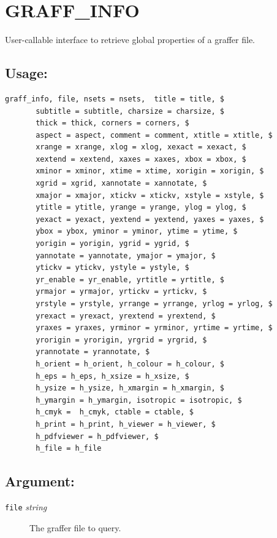 \documentclass[11pt,twoside,english]{article}
\begin{document}
\section{GRAFF\_INFO}
\label{sec:graff_info}

 
	User-callable interface to retrieve global properties of a graffer
	file.

 \subsection{Usage:}
 \label{sec:gi-usage}

 
\begin{verbatim}
graff_info, file, nsets = nsets,  title = title, $
       subtitle = subtitle, charsize = charsize, $
       thick = thick, corners = corners, $
       aspect = aspect, comment = comment, xtitle = xtitle, $
       xrange = xrange, xlog = xlog, xexact = xexact, $
       xextend = xextend, xaxes = xaxes, xbox = xbox, $
       xminor = xminor, xtime = xtime, xorigin = xorigin, $
       xgrid = xgrid, xannotate = xannotate, $
       xmajor = xmajor, xtickv = xtickv, xstyle = xstyle, $
       ytitle = ytitle, yrange = yrange, ylog = ylog, $
       yexact = yexact, yextend = yextend, yaxes = yaxes, $
       ybox = ybox, yminor = yminor, ytime = ytime, $
       yorigin = yorigin, ygrid = ygrid, $
       yannotate = yannotate, ymajor = ymajor, $
       ytickv = ytickv, ystyle = ystyle, $
       yr_enable = yr_enable, yrtitle = yrtitle, $
       yrmajor = yrmajor, yrtickv = yrtickv, $
       yrstyle = yrstyle, yrrange = yrrange, yrlog = yrlog, $
       yrexact = yrexact, yrextend = yrextend, $
       yraxes = yraxes, yrminor = yrminor, yrtime = yrtime, $
       yrorigin = yrorigin, yrgrid = yrgrid, $
       yrannotate = yrannotate, $
       h_orient = h_orient, h_colour = h_colour, $
       h_eps = h_eps, h_xsize = h_xsize, $
       h_ysize = h_ysize, h_xmargin = h_xmargin, $
       h_ymargin = h_ymargin, isotropic = isotropic, $
       h_cmyk =  h_cmyk, ctable = ctable, $
       h_print = h_print, h_viewer = h_viewer, $
       h_pdfviewer = h_pdfviewer, $
       h_file = h_file
\end{verbatim}

 \subsection{Argument:}
 \label{sec:gi-arg}

 
 \begin{description}
 \item[\texttt{file} \textit{string}] The graffer file to query.
 \end{description}
\end{document}
